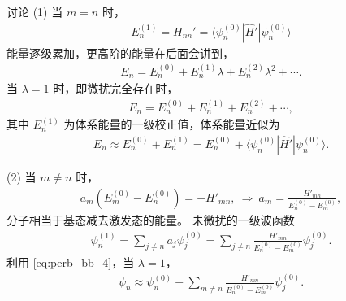 讨论 (1) 当 $m=n$ 时，
\begin{align}
    E_n^{(1)} = H_{nn}' = \langle \psi_n^{(0)} | \hat H' | \psi_n^{(0)} \rangle
\end{align}
能量逐级累加，更高阶的能量在后面会讲到，
\begin{align}
    E_n = E_n^{(0)} + E_n^{(1)} \lambda + E_n^{(2)}\lambda ^2 + \cdots.
\end{align}
当 $\lambda = 1$ 时，即微扰完全存在时，
\begin{align}
    E_n = E_n^{(0)} + E_n^{(1)} + E_n^{(2)} + \cdots, 
\end{align}
其中 $E_n^{(1)}$ 为体系能量的一级校正值，体系能量近似为
\begin{align}
    E_n \approx E_n^{(0)} + E_n^{(1)} = E_n^{(0)} + \langle \psi_n^{(0)} | \hat H ' | \psi_n^{(0)} \rangle. 
\end{align}

(2) 当 $m \neq n$ 时，
\begin{align}
    a_m (E_m^{(0)} - E_n^{(0)}) = - H'_{mn},\ \Rightarrow \ a_m = \frac{H'_{mn}}{E_n^{(0)} - E_m^{(0)}}, 
\end{align}
分子相当于基态减去激发态的能量。
未微扰的一级波函数
\begin{align}
    \psi_n^{(1)} = \sum_{j\neq n} a_j \psi_j^{(0)} = \sum_{j\neq n} \frac{H'_{mn}}{E_n^{(0)} - E_m^{(0)}}\psi_j^{(0)}. 
\end{align}
利用 \eqref{eq:perb_bb_4}，当 $\lambda = 1$，
\begin{align}
    \psi_n \approx \psi_n^{(0)} + \sum_{m\neq n} \frac{H'_{mn}}{E_n^{(0)} - E_m^{(0)}}\psi_j^{(0)}. 
\end{align}

